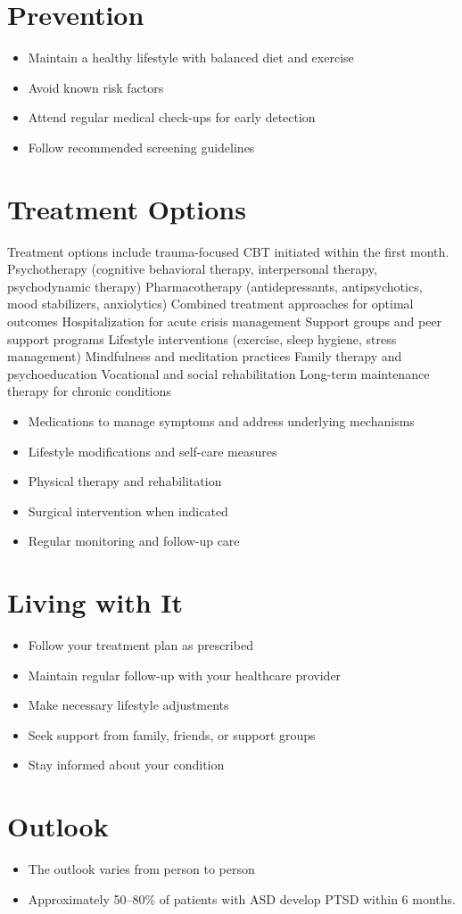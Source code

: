 \section{Prevention}
\begin{itemize}[noitemsep]
  \item Maintain a healthy lifestyle with balanced diet and exercise
  \item Avoid known risk factors
  \item Attend regular medical check-ups for early detection
  \item Follow recommended screening guidelines
\end{itemize}
\section{Treatment Options}
Treatment options include trauma-focused CBT initiated within the first month. Psychotherapy (cognitive behavioral therapy, interpersonal therapy, psychodynamic therapy) Pharmacotherapy (antidepressants, antipsychotics, mood stabilizers, anxiolytics) Combined treatment approaches for optimal outcomes Hospitalization for acute crisis management Support groups and peer support programs Lifestyle interventions (exercise, sleep hygiene, stress management) Mindfulness and meditation practices Family therapy and psychoeducation Vocational and social rehabilitation Long-term maintenance therapy for chronic conditions

\begin{itemize}[noitemsep]
  \item Medications to manage symptoms and address underlying mechanisms
  \item Lifestyle modifications and self-care measures
  \item Physical therapy and rehabilitation
  \item Surgical intervention when indicated
  \item Regular monitoring and follow-up care
\end{itemize}
\section{Living with It}
\begin{itemize}[noitemsep]
  \item Follow your treatment plan as prescribed
  \item Maintain regular follow-up with your healthcare provider
  \item Make necessary lifestyle adjustments
  \item Seek support from family, friends, or support groups
  \item Stay informed about your condition
\end{itemize}
\section{Outlook}
\begin{itemize}[noitemsep]
  \item The outlook varies from person to person
  \item Approximately 50--80\% of patients with ASD develop PTSD within 6 months.
\end{itemize}
